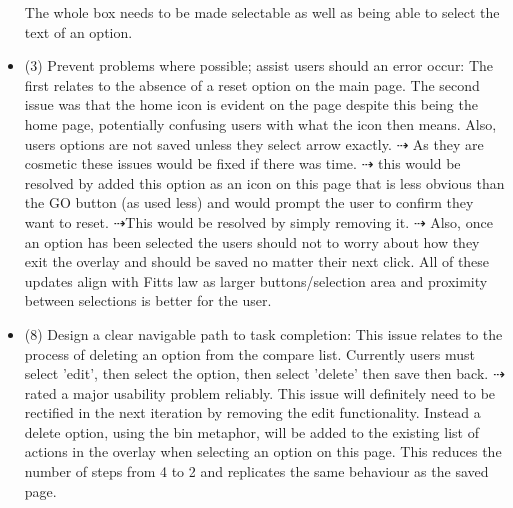 \documentclass[a4 paper, 12pt]{article}
\begin{document}
\begin{itemize}
    The whole box needs to be made selectable as well as being able to select the text of an option. 
    \item (3) Prevent problems where possible; assist users should an error occur: The first relates to the absence of a reset option on the main page. The second issue was that the home icon is evident on the page despite this being the home page, potentially confusing users with what the icon then means. Also, users options are not saved unless they select arrow exactly. $\dashrightarrow$ As they are cosmetic these issues would be fixed if there was time. $\dashrightarrow$ this would be resolved by added this option as an icon on this page that is less obvious than the GO button (as used less) and would prompt the user to confirm they want to reset.  $\dashrightarrow$This would be resolved by simply removing it.  $\dashrightarrow$
    Also, once an option has been selected the users should not to worry about how they exit the overlay and should be saved no matter their next click. All of these updates align with Fitts law as larger buttons/selection area and proximity between selections is better for the user. 
    \item (8) Design a clear navigable path to task completion: This issue relates to the process of deleting an option from the compare list. Currently users must select 'edit', then select the option, then select 'delete' then save then back. $\dashrightarrow$ rated a major usability problem reliably. This issue will definitely need to be rectified in the next iteration by removing the edit functionality. Instead a delete option, using the bin metaphor, will be added to the existing list of actions in the overlay when selecting an option on this page. This reduces the number of steps from 4 to 2 and replicates the same behaviour as the saved page. 
    \end{itemize}




\end{document}
